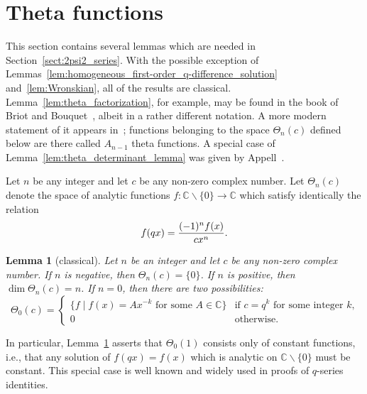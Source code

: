 \documentclass[10pt,a4paper]{amsart}
\numberwithin{equation}{section}
\newtheorem{Lemma}[Theorem]{Lemma}
\newcommand{\C}{\mathbb{C}}
\begin{document}
\section{Theta functions} \label{sect:theta}

This section contains several lemmas which are needed in Section~\ref{sect:2psi2_series}. With the possible exception of Lemmas~\ref{lem:homogeneous_first-order_q-difference_solution} and~\ref{lem:Wronskian}, all of the results are classical. Lemma~\ref{lem:theta_factorization}, for example, may be found in the book of Briot and Bouquet~\cite[p.~239]{Briot1875}, albeit in a rather different notation. A more modern statement of it appears in~\cite[Lemma~3.2]{Rosengren2006}; functions belonging to the space $\Theta_n(c)$ defined below are there called $A_{n-1}$ theta functions. A special case of Lemma~\ref{lem:theta_determinant_lemma} was given by Appell~\cite[p.~140]{Appell1884}.

\begin{Definition}
Let $n$ be any integer and let $c$ be any non-zero complex number. Let $\Theta_n(c)$ denote the space of analytic functions $f\colon \C \backslash \{0\} \rightarrow \C$ which satisfy identically the relation
\begin{equation} \label{eqn:nth_order_theta_functional_equation}
f(qx) = {(-1)^n f(x) \over cx^n}.
\end{equation}
\end{Definition}

\begin{Lemma}[classical] \label{lem:Theta_dimension}
Let $n$ be an integer and let $c$ be any non-zero complex number. If $n$ is negative, then $\Theta_n(c) = \{0\}$. If $n$ is positive, then $\dim \Theta_n(c) = n$. If $n=0$, then there are two possibilities:
\[ \Theta_0(c) = \begin{cases} \big\{f \mid f(x) = A x^{-k} \text{ for some } A \in \C\big\} &\text{if $c = q^k$ for some integer $k$,} \\
0 &\text{otherwise.}
\end{cases} \]
\end{Lemma}

\begin{Remark}
In particular, Lemma~\ref{lem:Theta_dimension} asserts that $\Theta_0(1)$ consists only of constant functions, i.e., that any solution of $f(qx)=f(x)$ which is analytic on $\C\backslash\{0\}$ must be constant. This special case is well known and widely used in proofs of $q$-series identities.
\end{Remark}
\end{document}
